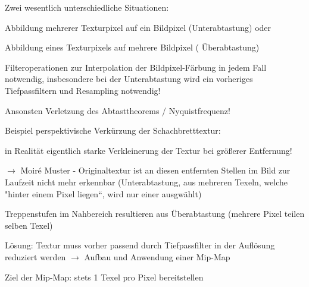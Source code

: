 \documentclass[landscape]{article}
\begin{document}
\begin{multicols}{3}
  Zwei wesentlich unterschiedliche Situationen:
  \begin{itemize*}
    \item Abbildung mehrerer Texturpixel auf ein Bildpixel (Unterabtastung) oder
    \item Abbildung eines Texturpixels auf mehrere Bildpixel ( Überabtastung)
    \item Filteroperationen zur Interpolation der Bildpixel-Färbung in jedem Fall notwendig, insbesondere bei der Unterabtastung wird ein vorheriges Tiefpassfiltern und Resampling notwendig!
    \item Ansonsten Verletzung des Abtasttheorems / Nyquistfrequenz!
  \end{itemize*}
  
  Beispiel perspektivische Verkürzung der Schachbretttextur:
  \begin{itemize*}
    \item in Realität eigentlich starke Verkleinerung der Textur bei größerer Entfernung!
    \item $\rightarrow$ Moiré Muster - Originaltextur ist an diesen entfernten Stellen im Bild zur Laufzeit nicht mehr erkennbar (Unterabtastung, aus mehreren Texeln, welche "hinter einem Pixel liegen“, wird nur einer ausgwählt)
    \item Treppenstufen im Nahbereich resultieren aus Überabtastung (mehrere Pixel teilen selben Texel)
    \item Lösung: Textur muss vorher passend durch Tiefpassfilter in der Auflösung reduziert werden $\rightarrow$ Aufbau und Anwendung einer Mip-Map
    \item Ziel der Mip-Map: stets 1 Texel pro Pixel bereitstellen
  \end{itemize*}
  
  

\end{multicols}
\end{document}
